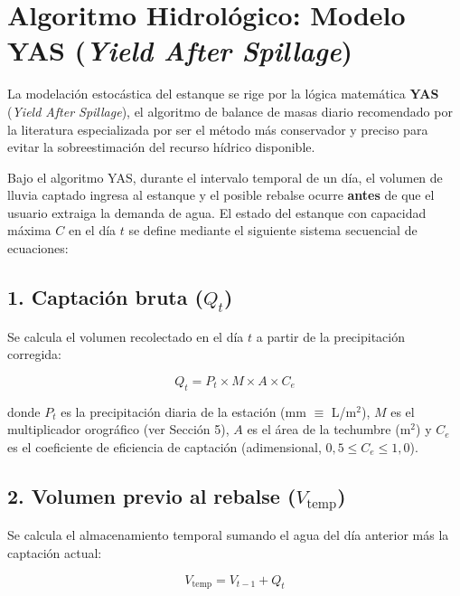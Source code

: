 \documentclass[12pt, a4paper]{article}
\begin{document}
\section{Algoritmo Hidrológico: Modelo YAS (\textit{Yield After Spillage})}

La modelación estocástica del estanque se rige por la lógica matemática \textbf{YAS} (\textit{Yield After Spillage}), el algoritmo de balance de masas diario recomendado por la literatura especializada \cite{fewkes1999} por ser el método más conservador y preciso para evitar la sobreestimación del recurso hídrico disponible.

Bajo el algoritmo YAS, durante el intervalo temporal de un día, el volumen de lluvia captado ingresa al estanque y el posible rebalse ocurre \textbf{antes} de que el usuario extraiga la demanda de agua. El estado del estanque con capacidad máxima $C$ en el día $t$ se define mediante el siguiente sistema secuencial de ecuaciones:

\subsection{1. Captación bruta ($Q_t$)}

Se calcula el volumen recolectado en el día $t$ a partir de la precipitación corregida:

\begin{equation}
    Q_t = P_t \times M \times A \times C_e
\end{equation}

donde $P_t$ es la precipitación diaria de la estación (mm $\equiv$ L/m$^2$), $M$ es el multiplicador orográfico (ver Sección 5), $A$ es el área de la techumbre (m$^2$) y $C_e$ es el coeficiente de eficiencia de captación (adimensional, $0{,}5 \leq C_e \leq 1{,}0$).

\subsection{2. Volumen previo al rebalse ($V_{\text{temp}}$)}

Se calcula el almacenamiento temporal sumando el agua del día anterior más la captación actual:

\begin{equation}
    V_{\text{temp}} = V_{t-1} + Q_t
\end{equation}
\end{document}
